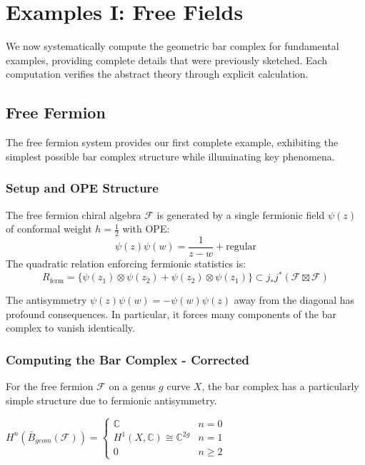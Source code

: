  
\section{Examples I: Free Fields}
 
We now systematically compute the geometric bar complex for fundamental examples, providing complete 
details that were previously sketched. Each computation verifies the abstract theory through explicit 
calculation.
 
\subsection{Free Fermion}
 
The free fermion system provides our first complete example, exhibiting the simplest possible bar complex 
structure while illuminating key phenomena.
 
\subsubsection{Setup and OPE Structure}
 
\begin{definition}
The free fermion chiral algebra $\mathcal{F}$ is generated by a single fermionic field $\psi(z)$ of 
conformal weight $h = \frac{1}{2}$ with OPE:
\[
\psi(z)\psi(w) = \frac{1}{z-w} + \text{regular}
\]
The quadratic relation enforcing fermionic statistics is:
\[
R_{\text{ferm}} = \{\psi(z_1) \otimes \psi(z_2) + \psi(z_2) \otimes \psi(z_1)\} \subset 
j_*j^*(\mathcal{F} \boxtimes \mathcal{F})
\]
\end{definition}
 
\begin{remark}
The antisymmetry $\psi(z)\psi(w) = -\psi(w)\psi(z)$ away from the diagonal has profound consequences. 
In particular, it forces many components of the bar complex to vanish identically.
\end{remark}
 
\subsubsection{Computing the Bar Complex - Corrected}

\begin{theorem}
For the free fermion $\mathcal{F}$ on a genus $g$ curve $X$, the bar complex has a particularly simple structure due to fermionic antisymmetry.


$H^n(\bar{B}_{geom}(\mathcal{F})) = \begin{cases}
\mathbb{C} & n = 0\\
H^1(X, \mathbb{C}) \cong \mathbb{C}^{2g} & n = 1\\
0 & n \geq 2
\end{cases}$
\end{theorem}

